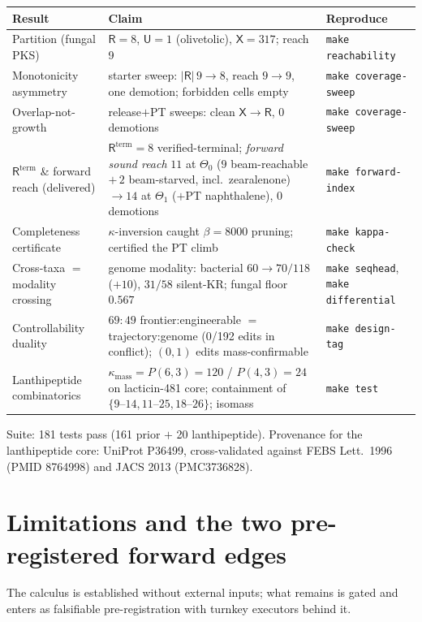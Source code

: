 \documentclass[11pt]{article}
\newcommand{\R}{\mathsf{R}}
\newcommand{\U}{\mathsf{U}}
\newcommand{\X}{\mathsf{X}}
\newcommand{\Rterm}{\mathsf{R}^{\mathrm{term}}}
\begin{document}
\begin{table}[h]
\centering\small
\renewcommand{\arraystretch}{1.25}
\begin{tabular}{@{}p{2.9cm}p{6.3cm}p{3.6cm}@{}}
\toprule
Result & Claim & Reproduce \\
\midrule
Partition (fungal PKS) & $\R=8$, $\U=1$ (olivetolic), $\X=317$; reach 9 & \texttt{make reachability} \\
Monotonicity asymmetry & starter sweep: $\lvert\R\rvert\,9{\to}8$, reach $9{\to}9$, one demotion; forbidden cells empty & \texttt{make coverage-sweep} \\
Overlap-not-growth & release$+$PT sweeps: clean $\X\to\R$, 0 demotions & \texttt{make coverage-sweep} \\
$\Rterm$ \& forward reach (delivered) & $\Rterm{=}8$ verified-terminal; \emph{forward sound reach} $11$ at $\Theta_0$ ($9$ beam-reachable $+\,2$ beam-starved, incl.\ zearalenone) $\to 14$ at $\Theta_1$ ($+$PT naphthalene), $0$ demotions & \texttt{make forward-index} \\
Completeness certificate & $\kappa$-inversion caught $\beta{=}8000$ pruning; certified the PT climb & \texttt{make kappa-check} \\
Cross-taxa $=$ modality crossing & genome modality: bacterial $60\to70/118$ ($+10$), $31/58$ silent-KR; fungal floor $0.567$ & \texttt{make seqhead}, \texttt{make differential} \\
Controllability duality & $69{:}49$ frontier:engineerable $=$ trajectory:genome (0/192 edits in conflict); $(0,1)$ edits mass-confirmable & \texttt{make design-tag} \\
Lanthipeptide combinatorics & $\kappa_{\mathrm{mass}}=P(6,3){=}120$ / $P(4,3){=}24$ on lacticin-481 core; containment of $\{9\text{--}14,11\text{--}25,18\text{--}26\}$; isomass & \texttt{make test} \\
\bottomrule
\end{tabular}
\end{table}

Suite: 181 tests pass (161 prior $+$ 20 lanthipeptide). Provenance for the lanthipeptide core: UniProt
P36499, cross-validated against FEBS Lett.\ 1996 (PMID 8764998) and JACS 2013 (PMC3736828).

\section{Limitations and the two pre-registered forward edges}
The calculus is established without external inputs; what remains is gated and enters as falsifiable
pre-registration with turnkey executors behind it.
\end{document}
